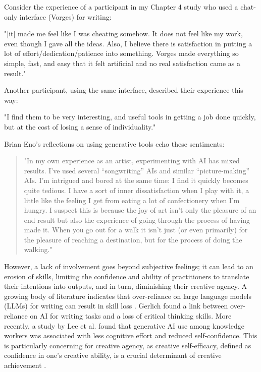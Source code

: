Consider the experience of a participant in my Chapter 4 study who used a chat-only interface (Vorges) for writing:

"[it] made me feel like I was cheating somehow. It does not feel like my work, even though I gave all the ideas. Also, I believe there is satisfaction in putting a lot of effort/dedication/patience into something. Vorges made everything so simple, fast, and easy that it felt artificial and no real satisfaction came as a result."

Another participant, using the same interface, described their experience this way:

"I find them to be very interesting, and useful tools in getting a job done quickly, but at the cost of losing a sense of individuality."

Brian Eno's reflections on using generative tools echo these sentiments:

\begin{quote}
"In my own experience as an artist, experimenting with AI has mixed results. I’ve used several “songwriting” AIs and similar “picture-making” AIs. I’m intrigued and bored at the same time: I find it quickly becomes quite tedious. I have a sort of inner dissatisfaction when I play with it, a little like the feeling I get from eating a lot of confectionery when I’m hungry. I suspect this is because the joy of art isn’t only the pleasure of an end result but also the experience of going through the process of having made it. When you go out for a walk it isn’t just (or even primarily) for the pleasure of reaching a destination, but for the process of doing the walking." \cite{Eno2024-rj}
\end{quote}

However, a lack of involvement goes beyond subjective feelings; it can lead to an erosion of skills, limiting the confidence and ability of practitioners to translate their intentions into outputs, and in turn, diminishing their creative agency. A growing body of literature indicates that over-reliance on large language models (LLMs) for writing can result in skill loss \cite{Heersmink2024-mk, Rafner2021-tm}. Gerlich \cite{Gerlich2025-as} found a link between over-reliance on AI for writing tasks and a loss of critical thinking skills. More recently, a study by Lee et al. \cite{Lee2025-dw} found that generative AI use among knowledge workers was associated with less cognitive effort and reduced self-confidence. This is particularly concerning for creative agency, as creative self-efficacy, defined as confidence in one's creative ability, is a crucial determinant of creative achievement \cite{Tierney2002-xp}.

